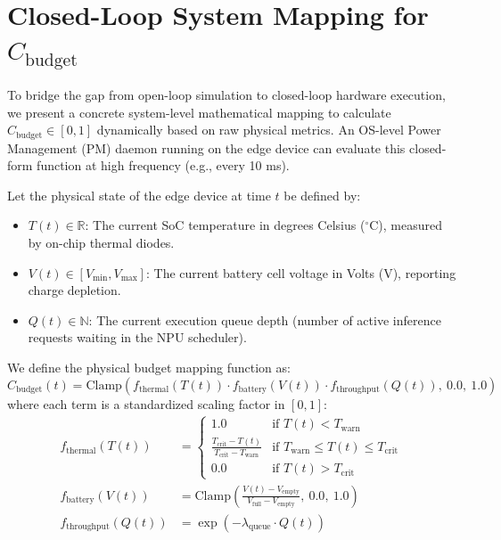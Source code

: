 \documentclass{article}
\theoremstyle{plain}
\theoremstyle{definition}
\theoremstyle{remark}
\begin{document}
\section{Closed-Loop System Mapping for $C_{\text{budget}}$}
\label{app:closed_loop_mapping}

To bridge the gap from open-loop simulation to closed-loop hardware execution, we present a concrete system-level mathematical mapping to calculate $C_{\text{budget}} \in [0, 1]$ dynamically based on raw physical metrics. An OS-level Power Management (PM) daemon running on the edge device can evaluate this closed-form function at high frequency (e.g., every 10 ms).

Let the physical state of the edge device at time $t$ be defined by:
\begin{itemize}
    \item $T(t) \in \mathbb{R}$: The current SoC temperature in degrees Celsius ($^{\circ}\text{C}$), measured by on-chip thermal diodes.
    \item $V(t) \in [V_{\min}, V_{\max}]$: The current battery cell voltage in Volts (V), reporting charge depletion.
    \item $Q(t) \in \mathbb{N}$: The current execution queue depth (number of active inference requests waiting in the NPU scheduler).
\end{itemize}

We define the physical budget mapping function as:
\begin{equation}
C_{\text{budget}}(t) = \text{Clamp}\left( f_{\text{thermal}}(T(t)) \cdot f_{\text{battery}}(V(t)) \cdot f_{\text{throughput}}(Q(t)),\ 0.0,\ 1.0 \right)
\label{eq:closed_loop_budget}
\end{equation}
where each term is a standardized scaling factor in $[0, 1]$:
\begin{align}
f_{\text{thermal}}(T(t)) &= \begin{cases} 
1.0 & \text{if } T(t) < T_{\text{warn}} \\
\frac{T_{\text{crit}} - T(t)}{T_{\text{crit}} - T_{\text{warn}}} & \text{if } T_{\text{warn}} \le T(t) \le T_{\text{crit}} \\
0.0 & \text{if } T(t) > T_{\text{crit}}
\end{cases} \\
f_{\text{battery}}(V(t)) &= \text{Clamp}\left( \frac{V(t) - V_{\text{empty}}}{V_{\text{full}} - V_{\text{empty}}},\ 0.0,\ 1.0 \right) \\
f_{\text{throughput}}(Q(t)) &= \exp\left( -\lambda_{\text{queue}} \cdot Q(t) \right)
\label{eq:factor_equations}
\end{align}
\end{document}
